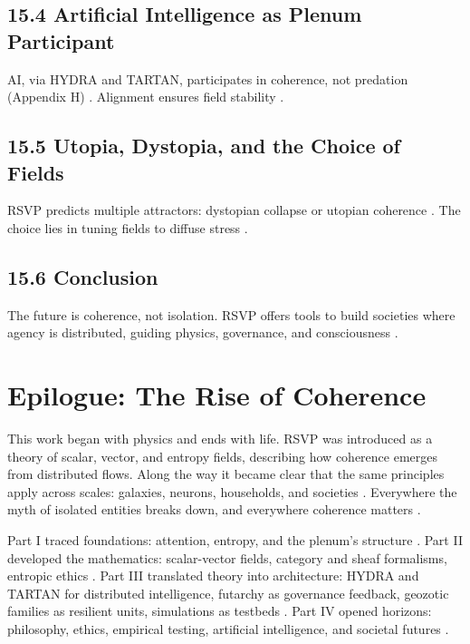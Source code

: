 \documentclass[12pt]{article}
\begin{document}
{{\subsection*{15.4 Artificial Intelligence as Plenum Participant}

AI, via HYDRA and TARTAN, participates in coherence, not predation (Appendix H) \citep{bird1988}. Alignment ensures field stability \citep{friston2010}.

\subsection*{15.5 Utopia, Dystopia, and the Choice of Fields}

RSVP predicts multiple attractors: dystopian collapse or utopian coherence \citep{zuboff2019}. The choice lies in tuning fields to diffuse stress \citep{deleuze1987}.

\subsection*{15.6 Conclusion}

The future is coherence, not isolation. RSVP offers tools to build societies where agency is distributed, guiding physics, governance, and consciousness \citep{whitehead1978}.

\section*{Epilogue: The Rise of Coherence}

This work began with physics and ends with life. RSVP was introduced as a theory of scalar, vector, and entropy fields, describing how coherence emerges from distributed flows. Along the way it became clear that the same principles apply across scales: galaxies, neurons, households, and societies \citep{gromov1999}. Everywhere the myth of isolated entities breaks down, and everywhere coherence matters \citep{whitehead1978}.

Part I traced foundations: attention, entropy, and the plenum’s structure \citep{zuboff2019, shannon1948}. Part II developed the mathematics: scalar-vector fields, category and sheaf formalisms, entropic ethics \citep{maclane1998, lawvere2009}. Part III translated theory into architecture: HYDRA and TARTAN for distributed intelligence, futarchy as governance feedback, geozotic families as resilient units, simulations as testbeds \citep{bird1988, hanson2003}. Part IV opened horizons: philosophy, ethics, empirical testing, artificial intelligence, and societal futures \citep{ortega1957, tononi2004}.

}}
\end{document}
